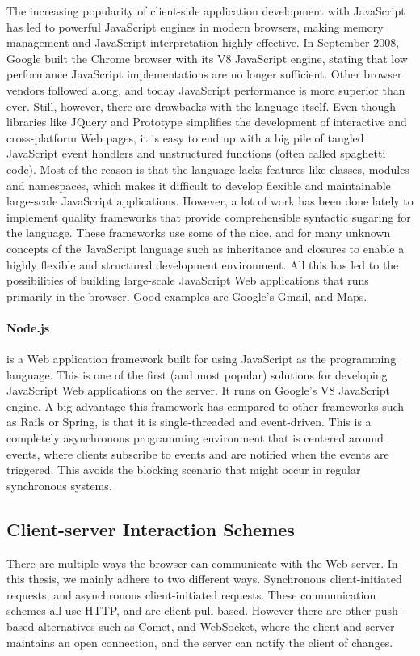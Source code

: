 The increasing popularity of client-side application development with JavaScript has led to powerful JavaScript engines in modern browsers, making memory management and JavaScript interpretation highly effective. In September 2008, Google built the Chrome browser with its V8 JavaScript engine\cite{v8}, stating that low performance JavaScript implementations are no longer sufficient. Other browser vendors followed along, and today JavaScript performance is more superior than ever. Still, however, there are drawbacks with the language itself. Even though libraries like JQuery and Prototype simplifies the development of interactive and cross-platform Web pages, it is easy to end up with a big pile of tangled JavaScript event handlers and unstructured functions (often called spaghetti code\cite{spagetticode}). Most of the reason is that the language lacks features like classes, modules and namespaces, which makes it difficult to develop flexible and maintainable large-scale JavaScript applications. However, a lot of work has been done lately to implement quality frameworks that provide comprehensible syntactic sugaring for the language. These frameworks use some of the nice, and for many unknown concepts of the JavaScript language such as inheritance and closures to enable a highly flexible and structured development environment. All this has led to the possibilities of building large-scale JavaScript Web applications that runs primarily in the browser. Good examples are Google's Gmail\cite{mail}, and Maps\cite{maps}.

\paragraph{Node.js}\cite{node} is a Web application framework built for using JavaScript as the programming language. This is one of the first (and most popular) solutions for developing JavaScript Web applications on the server. It runs on Google's V8 JavaScript engine. A big advantage this framework has compared to other frameworks such as Rails or Spring, is that it is single-threaded and event-driven. This is a completely asynchronous programming environment that is centered around events, where clients subscribe to events and are notified when the events are triggered. This avoids the blocking scenario that might occur in regular synchronous systems. 


\subsection{Client-server Interaction Schemes}
There are multiple ways the browser can communicate with the Web server. In this thesis, we mainly adhere to two different ways. Synchronous client-initiated requests, and asynchronous client-initiated requests. These communication schemes all use HTTP, and are client-pull based. However there are other push-based alternatives such as Comet\cite{comet}, and WebSocket\cite{websocket}, where the client and server maintains an open connection, and the server can notify the client of changes.

